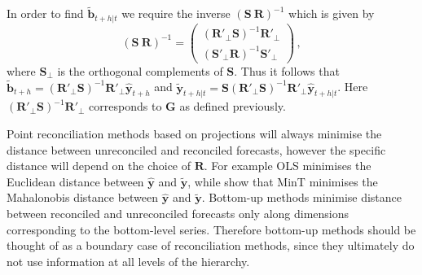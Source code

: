 \documentclass[12pt]{article}
\theoremstyle{definition}
\begin{document}

In order to find $\tilde{\bm{b}}_{t+h|t}$ we require the inverse $(\bm{S} ~ \bm{R})^{-1}$ which is given by
\begin{equation}
(\bm{S} ~ \bm{R})^{-1} = \begin{pmatrix}
(\bm{R}'_\bot \bm{S})^{-1}\bm{R}'_\bot \\ (\bm{S}'_\bot \bm{R})^{-1}\bm{S}'_\bot
\end{pmatrix}\,,
\end{equation}
where $\bm{S}_{\bot}$ is the orthogonal complements of $\bm{S}$. Thus it follows that $\tilde{\bm{b}}_{t+h}=(\bm{R}'_\bot \bm{S})^{-1}\bm{R}'_\bot \hat{\bm{y}}_{t+h}$ and $\tilde{\bm{y}}_{t+h|t}=\bm{S}(\bm{R}'_\bot \bm{S})^{-1}\bm{R}'_\bot \hat{\bm{y}}_{t+h|t}$. Here $(\bm{R}'_\bot \bm{S})^{-1}\bm{R}'_\bot$ corresponds to $\bm{G}$ as defined previously.

Point reconciliation methods based on projections will always minimise the distance between unreconciled and reconciled forecasts, however the specific distance will depend on the choice of $\bm{R}$. For example OLS minimises the Euclidean distance between $\hat{\bm{y}}$ and $\tilde{\bm{y}}$, while \citet{Wickramasuriya2017} show that MinT minimises the Mahalonobis distance between $\hat{\bm{y}}$ and $\tilde{\bm{y}}$. Bottom-up methods minimise distance between reconciled and unreconciled forecasts only along dimensions corresponding to the bottom-level series. Therefore bottom-up methods should be thought of as a boundary case of reconciliation methods, since they ultimately do not use information at all levels of the hierarchy.

\end{document}
